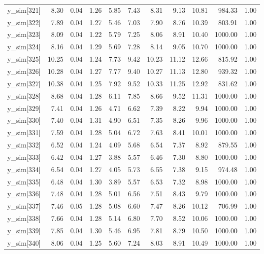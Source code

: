 \begin{table}[ht]
\begin{tabular}{rrrrrrrrrrr}
  y\_sim[321] & 8.30 & 0.04 & 1.26 & 5.85 & 7.43 & 8.31 & 9.13 & 10.81 & 984.33 & 1.00 \\ 
  y\_sim[322] & 7.89 & 0.04 & 1.27 & 5.46 & 7.03 & 7.90 & 8.76 & 10.39 & 803.91 & 1.00 \\ 
  y\_sim[323] & 8.09 & 0.04 & 1.22 & 5.79 & 7.25 & 8.06 & 8.91 & 10.40 & 1000.00 & 1.00 \\ 
  y\_sim[324] & 8.16 & 0.04 & 1.29 & 5.69 & 7.28 & 8.14 & 9.05 & 10.70 & 1000.00 & 1.00 \\ 
  y\_sim[325] & 10.25 & 0.04 & 1.24 & 7.73 & 9.42 & 10.23 & 11.12 & 12.66 & 815.92 & 1.00 \\ 
  y\_sim[326] & 10.28 & 0.04 & 1.27 & 7.77 & 9.40 & 10.27 & 11.13 & 12.80 & 939.32 & 1.00 \\ 
  y\_sim[327] & 10.38 & 0.04 & 1.25 & 7.92 & 9.52 & 10.33 & 11.25 & 12.92 & 831.62 & 1.00 \\ 
  y\_sim[328] & 8.68 & 0.04 & 1.28 & 6.11 & 7.85 & 8.66 & 9.52 & 11.31 & 1000.00 & 1.00 \\ 
  y\_sim[329] & 7.41 & 0.04 & 1.26 & 4.71 & 6.62 & 7.39 & 8.22 & 9.94 & 1000.00 & 1.00 \\ 
  y\_sim[330] & 7.40 & 0.04 & 1.31 & 4.90 & 6.51 & 7.35 & 8.26 & 9.96 & 1000.00 & 1.00 \\ 
  y\_sim[331] & 7.59 & 0.04 & 1.28 & 5.04 & 6.72 & 7.63 & 8.41 & 10.01 & 1000.00 & 1.00 \\ 
  y\_sim[332] & 6.52 & 0.04 & 1.24 & 4.09 & 5.68 & 6.54 & 7.37 & 8.92 & 879.55 & 1.00 \\ 
  y\_sim[333] & 6.42 & 0.04 & 1.27 & 3.88 & 5.57 & 6.46 & 7.30 & 8.80 & 1000.00 & 1.00 \\ 
  y\_sim[334] & 6.54 & 0.04 & 1.27 & 4.05 & 5.73 & 6.55 & 7.38 & 9.15 & 974.48 & 1.00 \\ 
  y\_sim[335] & 6.48 & 0.04 & 1.30 & 3.89 & 5.57 & 6.53 & 7.32 & 8.98 & 1000.00 & 1.00 \\ 
  y\_sim[336] & 7.48 & 0.04 & 1.28 & 5.01 & 6.56 & 7.51 & 8.43 & 9.79 & 1000.00 & 1.00 \\ 
  y\_sim[337] & 7.46 & 0.05 & 1.28 & 5.08 & 6.60 & 7.47 & 8.26 & 10.12 & 706.99 & 1.00 \\ 
  y\_sim[338] & 7.66 & 0.04 & 1.28 & 5.14 & 6.80 & 7.70 & 8.52 & 10.06 & 1000.00 & 1.00 \\ 
  y\_sim[339] & 7.85 & 0.04 & 1.30 & 5.46 & 6.95 & 7.81 & 8.79 & 10.50 & 1000.00 & 1.00 \\ 
  y\_sim[340] & 8.06 & 0.04 & 1.25 & 5.60 & 7.24 & 8.03 & 8.91 & 10.49 & 1000.00 & 1.00 \\ 

\end{tabular}
\end{table}
